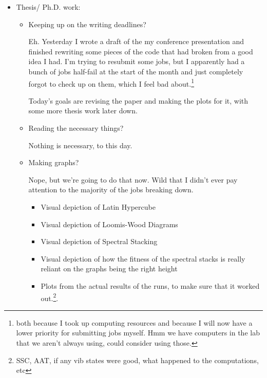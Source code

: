\documentclass[12pt]{article}
\renewcommand{\,}{\textsuperscript{,}}
\begin{document}
\begin{enumerate}
\begin{itemize}

\item Thesis/ Ph.D. work:

\begin{itemize}

\item Keeping up on the writing deadlines?

Eh. Yesterday I wrote a draft of the my conference presentation and finished rewriting some pieces of the code that had broken from a good idea I had.  
I'm trying to resubmit some jobs, but I apparently had a bunch of jobs half-fail at the start of the month and just completely forgot to check up on them, which I feel bad about.\footnote{both because I took up computing resources and because I will now have a lower priority for submitting jobs myself. Hmm we have computers in the lab that we aren't always using, could consider using those.}

Today's goals are revising the paper and making the plots for it, with some more thesis work later down.

\item Reading the necessary things?

Nothing is necessary, to this day.

\item Making graphs?

Nope, but we're going to do that now.  
Wild that I didn't ever pay attention to the majority of the jobs breaking down.

\begin{itemize}

\item Visual depiction of Latin Hypercube

\item Visual depiction of Loomis-Wood Diagrams

\item Visual depiction of Spectral Stacking

\item Visual depiction of how the fitness of the spectral stacks is really reliant on the graphs being the right height

\item Plots from the actual results of the runs, to make sure that it worked out.\footnote{SSC, AAT, if any vib states were good, what happened to the computations, etc}.

\end{itemize}


\end{itemize}
\end{itemize}
\end{enumerate}
\end{document}
